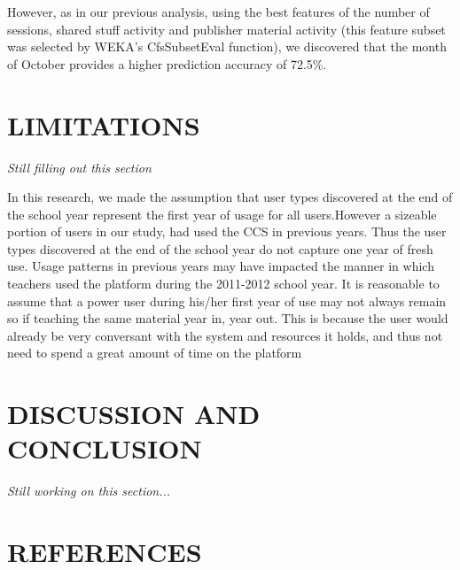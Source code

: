 \documentclass{acm_proc_article-sp}
\begin{document}
However, as in our previous analysis, using the best features of the number of sessions, shared stuff activity and publisher material activity (this feature subset was selected by WEKA's CfsSubsetEval function), we discovered that the month of October provides a higher prediction accuracy of 72.5\%.

\section{LIMITATIONS}
\textit{Still filling out this section}

In this research, we made the assumption that user types discovered at the end of the school year represent the first year of usage for all users.However a sizeable portion of users in our study, had used the CCS in previous years. Thus the user types discovered at the end of the school year do not capture one year of fresh use. Usage patterns in previous years may have impacted the manner in which teachers used the platform during the 2011-2012 school year. It is reasonable to assume that a power user during his/her first year of use may not always remain so if teaching the same material year in, year out. This is because the user would already be very conversant with the system and resources it holds, and thus not need to spend a great amount of time on the platform
\section{DISCUSSION AND CONCLUSION}
\textit{Still working on this section...}
\section{REFERENCES}

  
\end{document}
